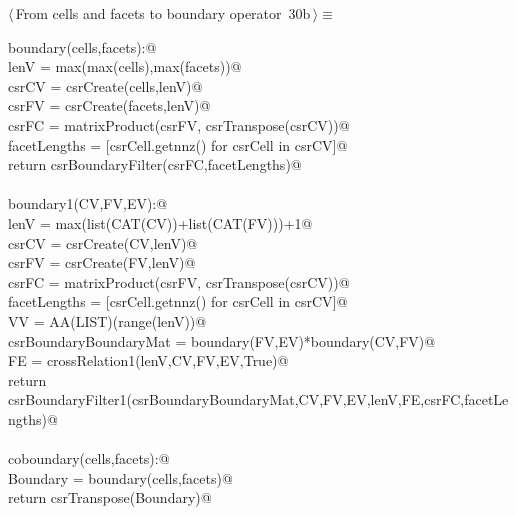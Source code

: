 \documentclass[11pt,oneside]{article}	%
\begin{document}
\begin{flushleft} \small \label{scrap49}
\protect{}$\langle\,$From cells and facets to boundary operator\nobreak\ {\footnotesize 30b}$\,\rangle\equiv$
\vspace{-1ex}
\begin{list}{}{} \item
\mbox{}\verb@def boundary(cells,facets):@\\
\mbox{}\verb@   lenV = max(max(cells),max(facets))@\\
\mbox{}\verb@   csrCV = csrCreate(cells,lenV)@\\
\mbox{}\verb@   csrFV = csrCreate(facets,lenV)@\\
\mbox{}\verb@   csrFC = matrixProduct(csrFV, csrTranspose(csrCV))@\\
\mbox{}\verb@   facetLengths = [csrCell.getnnz() for csrCell in csrCV]@\\
\mbox{}\verb@   return csrBoundaryFilter(csrFC,facetLengths)@\\
\mbox{}\verb@@\\
\mbox{}\verb@def boundary1(CV,FV,EV):@\\
\mbox{}\verb@   lenV = max(list(CAT(CV))+list(CAT(FV)))+1@\\
\mbox{}\verb@   csrCV = csrCreate(CV,lenV)@\\
\mbox{}\verb@   csrFV = csrCreate(FV,lenV)@\\
\mbox{}\verb@   csrFC = matrixProduct(csrFV, csrTranspose(csrCV))@\\
\mbox{}\verb@   facetLengths = [csrCell.getnnz() for csrCell in csrCV]@\\
\mbox{}\verb@   VV = AA(LIST)(range(lenV))@\\
\mbox{}\verb@   csrBoundaryBoundaryMat = boundary(FV,EV)*boundary(CV,FV)@\\
\mbox{}\verb@   FE = crossRelation1(lenV,CV,FV,EV,True)@\\
\mbox{}\verb@   return csrBoundaryFilter1(csrBoundaryBoundaryMat,CV,FV,EV,lenV,FE,csrFC,facetLengths)@\\
\mbox{}\verb@@\\
\mbox{}\verb@def coboundary(cells,facets):@\\
\mbox{}\verb@   Boundary = boundary(cells,facets)@\\
\mbox{}\verb@   return csrTranspose(Boundary)@\\

\end{list}
\end{flushleft}
\end{document}

